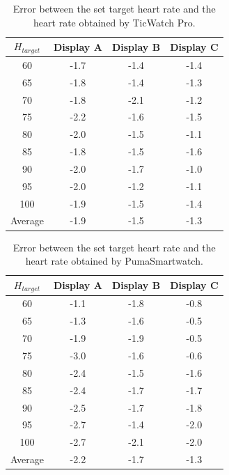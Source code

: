 \documentclass[sigchi,authordraft]{acmart}
\begin{document}
\begin{table}[!t]
  \centering
  \caption{Error between the set target heart rate and the heart rate obtained by TicWatch Pro.}
  \begin{tabular}{c|c|c|c} \hline\hline
    $H_{target}$ & Display A & Display B & Display C \\ \hline
    60 & -1.7 & -1.4 & -1.4 \\
    65 & -1.8 & -1.4 & -1.3 \\
    70 & -1.8 & -2.1 & -1.2 \\
    75 & -2.2 & -1.6 & -1.5 \\
    80 & -2.0 & -1.5 & -1.1 \\
    85 & -1.8 & -1.5 & -1.6 \\
    90 & -2.0 & -1.7 & -1.0 \\
    95 & -2.0 & -1.2 & -1.1 \\
    100 & -1.9 & -1.5 & -1.4 \\ \hline
    Average & -1.9 & -1.5 & -1.3 \\ \hline
  \end{tabular}
  \label{tab:ticwatch_result}
\end{table}

\begin{table}[!t]
  \centering
  \caption{Error between the set target heart rate and the heart rate obtained by PumaSmartwatch.}
  \begin{tabular}{c|c|c|c} \hline\hline
    $H_{target}$ & Display A & Display B & Display C \\ \hline
    60 & -1.1 & -1.8 & -0.8 \\
    65 & -1.3 & -1.6 & -0.5 \\
    70 & -1.9 & -1.9 & -0.5 \\
    75 & -3.0 & -1.6 & -0.6 \\
    80 & -2.4 & -1.5 & -1.6 \\
    85 & -2.4 & -1.7 & -1.7 \\
    90 & -2.5 & -1.7 & -1.8 \\
    95 & -2.7 & -1.4 & -2.0 \\
    100 & -2.7 & -2.1 & -2.0 \\ \hline
    Average & -2.2 & -1.7 & -1.3 \\ \hline
  \end{tabular}
  \label{tab:puma_result}
\end{table}


\end{document}
